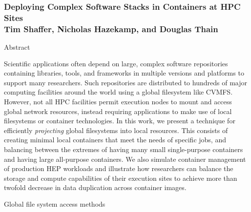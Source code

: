 \documentclass{beamer}
\newenvironment{BlueBlock}[1]
{\begin{alertblock}{#1\rule{0pt}{2.3ex}} \vspace*{16pt}}
{\end{alertblock}}
\begin{document}
\begin{frame}[fragile]
\frametitle{
  {\fontsize{55pt}{55pt}\selectfont
  \textbf{Deploying Complex Software Stacks in Containers at HPC Sites}} \\ \vspace{32pt}
  {\fontsize{48pt}{48pt}\selectfont
  Tim Shaffer, Nicholas Hazekamp, and Douglas Thain}
}

\begin{minipage}[t][0.93\textheight]{0.32\textwidth}

\begin{BlueBlock}{Abstract}
\parbox{\linewidth}{
Scientific applications often depend on large,
complex software repositories containing libraries, tools,
and frameworks in multiple versions and platforms to support many researchers.
Such repositories are distributed to hundreds of major computing facilities around the world using a global filesystem like CVMFS.
However, not all HPC facilities permit execution nodes to mount and access global network resources,
instead requiring applications to make use of local filesystems or container technologies.
In this work, we present a technique for efficiently \emph{projecting} global filesystems into local resources.
This consists of creating minimal local containers that meet the needs of specific jobs,
and balancing between the extremes of having many small single-purpose containers and having large all-purpose containers.
We also simulate container management of production HEP workloads and illustrate how researchers can balance the storage and compute capabilities of their execution sites to achieve more than twofold decrease in data duplication across container images.
}
\end{BlueBlock}

\vfill

\begin{BlueBlock}{Global file system access methods}
\parbox{0.6\linewidth}{
}
\hfill
\parbox{0.35\linewidth}{
\vspace*{1.5ex}

}
\end{BlueBlock}
\end{minipage}
\end{frame}
\end{document}
